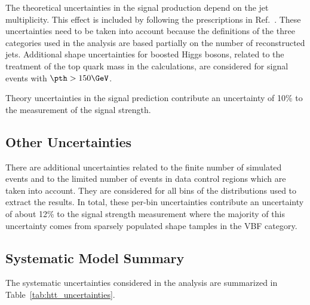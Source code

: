 The theoretical uncertainties in the signal production depend on the jet multiplicity. This effect is included 
by following the prescriptions in Ref.~\cite{Stewart:2011cf}. These uncertainties need to be taken into account because 
the definitions of the three categories used in the analysis are based partially on the number of reconstructed 
jets. Additional shape uncertainties for boosted Higgs bosons, related to the treatment of the top quark mass in 
the calculations, are considered for signal events with $\pth>150\GeV$.

Theory uncertainties in the signal prediction contribute an uncertainty of 10\% to the measurement of the signal strength.


\subsection{Other Uncertainties}
There are additional uncertainties related to the finite number of simulated events and to the limited number 
of events in data control regions which are taken into account. They are considered for all bins of the 
distributions used to extract the results. In total, these per-bin uncertainties contribute an uncertainty of 
about 12\% to the signal strength measurement where the majority of this uncertainty comes from sparsely populated 
shape tamples in the VBF category.


\subsection{Systematic Model Summary}
The systematic uncertainties considered in the analysis are summarized in Table~\ref{tab:htt_uncertainties}.

